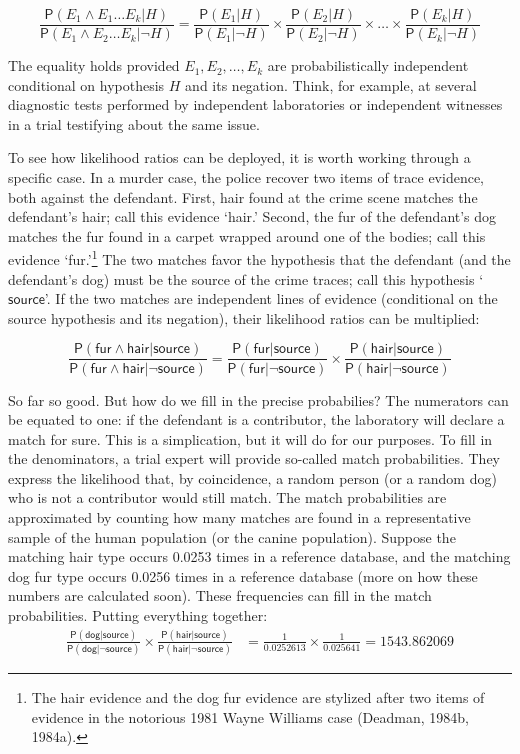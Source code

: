 \documentclass[
  letterpaper,
  DIV=11,
  numbers=noendperiod]{scrartcl}
\newcommand{\pr}[1]{\mathsf{P}(#1)}
\newcommand{\s}[1]{\mbox{$\mathsf{#1}$}}
\begin{document}
\[
\frac{\pr{E_1 \wedge E_1 \dots E_k \vert H}}{\pr{E_1 \wedge E_2 \dots E_k \vert \neg H}} = \frac{\pr{E_1 \vert H}}{\pr{E_1 \vert \neg H}}\times \frac{\pr{E_2 \vert H}}{\pr{E_2 \vert \neg H}} \times \dots \times \frac{\pr{E_k \vert H}}{\pr{E_k \vert \neg H}}
\]

\noindent The equality holds provided \(E_1, E_2, \dots, E_k\) are
probabilistically independent conditional on hypothesis \(H\) and its
negation. Think, for example, at several diagnostic tests performed by
independent laboratories or independent witnesses in a trial testifying
about the same issue.

To see how likelihood ratios can be deployed, it is worth working
through a specific case. In a murder case, the police recover two items
of trace evidence, both against the defendant. First, hair found at the
crime scene matches the defendant's hair; call this evidence
`\textsf{hair}.' Second, the fur of the defendant's dog matches the fur
found in a carpet wrapped around one of the bodies; call this evidence
`\textsf{fur}.'\footnote{The hair evidence and the dog fur evidence are
  stylized after two items of evidence in the notorious 1981 Wayne
  Williams case (Deadman, 1984b, 1984a).} The two matches favor the
hypothesis that the defendant (and the defendant's dog) must be the
source of the crime traces; call this hypothesis `\(\mathsf{source}\)'.
If the two matches are independent lines of evidence (conditional on the
source hypothesis and its negation), their likelihood ratios can be
multiplied:

\[
\frac{{\pr{\s{fur} \wedge \s{hair}  \vert \s{source}}}}{{\pr{\s{fur} \wedge \s{hair} \vert \neg \s{source}}}} = \frac{{\pr{\s{fur} \vert \s{source}}}}{{\pr{\s{fur}  \vert \neg \s{source}}}} \times
 \frac{{\pr{\s{hair} \vert \s{source}}}}{{\pr{\s{hair} \vert \neg \s{source}}}}
\]

So far so good. But how do we fill in the precise probabilies? The
numerators can be equated to one: if the defendant is a contributor, the
laboratory will declare a match for sure. This is a simplication, but it
will do for our purposes. To fill in the denominators, a trial expert
will provide so-called match probabilities. They express the likelihood
that, by coincidence, a random person (or a random dog) who is not a
contributor would still match. The match probabilities are approximated
by counting how many matches are found in a representative sample of the
human population (or the canine population). Suppose the matching hair
type occurs 0.0253 times in a reference database, and the matching dog
fur type occurs 0.0256 times in a reference database (more on how these
numbers are calculated soon). These frequencies can fill in the match
probabilities. Putting everything together: \begin{align*}
\frac{{\pr{\s{dog} \vert \s{source}}}}{{\pr{\s{dog}  \vert \neg \s{source}}}} \times
 \frac{{\pr{\s{hair} \vert \s{source}}}}{{\pr{\s{hair} \vert \neg \s{source}}}}
& =  \frac{1}{0.0252613} \times  \frac{1}{0.025641} = {1543.862069}
\end{align*}
\end{document}
